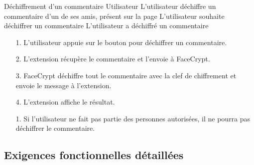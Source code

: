 \documentclass[a4paper,11pt,french]{article}
\begin{document}
\fiche
	{Déchiffrement d'un commentaire}
	{Utilisateur}
	{L'utilisateur déchiffre un commentaire d'un de ses amis, présent sur la
        page}
	{}
	{L'utilisateur souhaite déchiffrer un commentaire}
	{L'utilisateur a déchiffré un commentaire}
    {\begin{itemize}
        \item[]
        \item[1.] L'utilisateur appuie sur le bouton pour 
            déchiffrer un commentaire.
    \end{itemize}
    }
	{\begin{itemize}
        \item[]
		\item[2.] L'extension récupère le commentaire et l'envoie à 
            FaceCrypt.
        \item[3.] FaceCrypt déchiffre tout le commentaire avec la clef
            de chiffrement et envoie le message à l'extension.
        \item[4.] L'extension affiche le résultat.
	\end{itemize}
	}
	{}
\flots
    {}
    {\begin{itemize}
    \item[]
    \item[1.] Si l'utilisateur ne fait pas partie des personnes
        autorisées, il ne pourra pas déchiffrer le commentaire.
    \end{itemize}
    }
	{}    

\pagebreak
\subsection{Exigences fonctionnelles détaillées}


\end{document}
